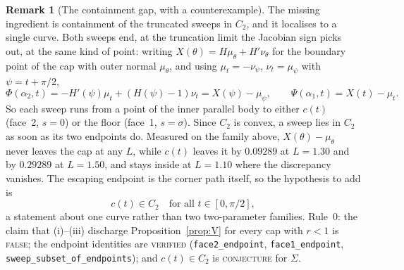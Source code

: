\documentclass[11pt]{article}
\theoremstyle{definition}
\newtheorem{remark}[theorem]{Remark}
\newcommand{\Sig}{\Sigma}
\begin{document}
\begin{remark}[The containment gap, with a counterexample]
The missing ingredient is containment of the truncated sweeps in $C_2$, and it localises to a
single curve. Both sweeps end, at the truncation limit the Jacobian sign picks out, at the
same kind of point: writing $X(\theta)=H\mu_\theta+H'\nu_\theta$ for the boundary point of
the cap with outer normal $\mu_\theta$, and using $\mu_t=-\nu_\psi$, $\nu_t=\mu_\psi$ with
$\psi=t+\pi/2$,
\[
  \Phi(\alpha_2,t)=-H'(\psi)\mu_t+(H(\psi)-1)\nu_t=X(\psi)-\mu_\psi ,
  \qquad \Psi(\alpha_1,t)=X(t)-\mu_t .
\]
So each sweep runs from a point of the inner parallel body to either $c(t)$ (face~2, $s=0$)
or the floor (face~1, $s=\sigma$). Since $C_2$ is convex, a sweep lies in $C_2$ as soon as
its two endpoints do. Measured on the family above, $X(\theta)-\mu_\theta$ never leaves the
cap at any $L$, while $c(t)$ leaves it by $0.09289$ at $L=1.30$ and by $0.29289$ at $L=1.50$,
and stays inside at $L=1.10$ where the discrepancy vanishes. The escaping endpoint is the
corner path itself, so the hypothesis to add is
\[
  c(t)\in C_2 \quad\text{for all } t\in[0,\pi/2],
\]
a statement about one curve rather than two two-parameter families. Rule~0: the claim that
(i)--(iii) discharge Proposition~\ref{prop:V} for every cap with $r<1$ is
\textsc{false}; the endpoint identities are \textsc{verified}
(\verb|face2_endpoint|, \verb|face1_endpoint|, \verb|sweep_subset_of_endpoints|); and
$c(t)\in C_2$ is \textsc{conjecture} for $\Sig$.
\end{remark}
\end{document}
